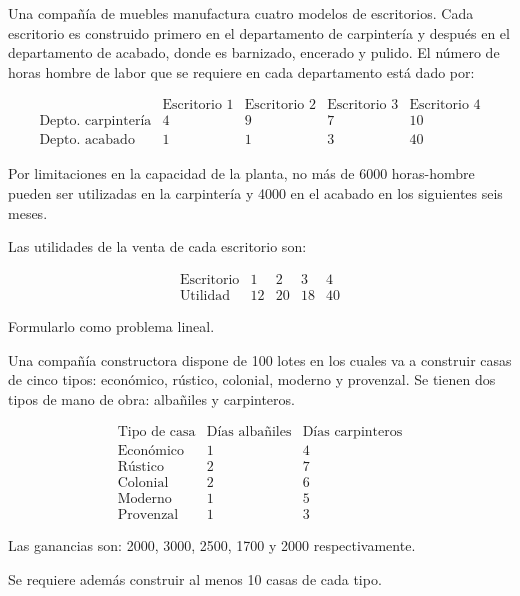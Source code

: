 \begin{Ejer}
\end{Ejer}


\begin{Ejer} Una compa\~n\'ia de muebles manufactura cuatro modelos de escritorios. Cada escritorio es construido primero en el departamento de carpinter\'ia y despu\'es en el departamento de acabado, donde es barnizado, encerado y pulido. El n\'umero de horas hombre de labor que se requiere en cada departamento est\'a dado por:

\[
\begin{array}{c|cccc}
 & \text{Escritorio 1} & \text{Escritorio 2} & \text{Escritorio 3} & \text{Escritorio 4} \\
\hline
\text{Depto. carpinter\'ia} & 4 & 9 & 7 & 10 \\
\text{Depto. acabado} & 1 & 1 & 3 & 40
\end{array}
\]

Por limitaciones en la capacidad de la planta, no m\'as de 6000 horas-hombre pueden ser utilizadas en la carpinter\'ia y 4000 en el acabado en los siguientes seis meses.

Las utilidades de la venta de cada escritorio son:

\[
\begin{array}{c|cccc}
\text{Escritorio} & 1 & 2 & 3 & 4 \\
\hline
\text{Utilidad} & 12 & 20 & 18 & 40
\end{array}
\]

Formularlo como problema lineal.
\end{Ejer}

\begin{Ejer}
Una compa\~n\'ia constructora dispone de 100 lotes en los cuales va a construir casas de cinco tipos: econ\'omico, r\'ustico, colonial, moderno y provenzal. Se tienen dos tipos de mano de obra: alba\~niles y carpinteros.

\[
\begin{array}{c|cc}
\text{Tipo de casa} & \text{D\'ias alba\~niles} & \text{D\'ias carpinteros} \\
\hline
\text{Econ\'omico} & 1 & 4 \\
\text{R\'ustico} & 2 & 7 \\
\text{Colonial} & 2 & 6 \\
\text{Moderno} & 1 & 5 \\
\text{Provenzal} & 1 & 3
\end{array}
\]

Las ganancias son:  
2000, 3000, 2500, 1700 y 2000 respectivamente.

Se requiere adem\'as construir al menos 10 casas de cada tipo.
\end{Ejer}


